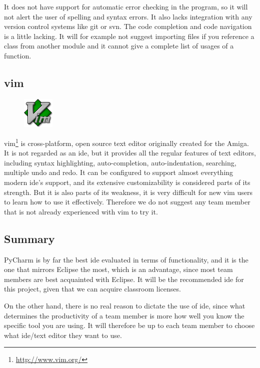 It does not have support for automatic error checking in the program, so it
will not alert the user of spelling and syntax errors. It also lacks integration
with any version control systems like git or svn. The code completion and
code navigation is a little lacking. It will for example not suggest importing
files if you reference a class from another module and it cannot give a
complete list of usages of a function.

\subsection{\gls{vim}}
\begin{figure}
	\vspace{-20pt}
	\includegraphics[width=1.5cm]{./planning/img/vim_logo}
	\vspace{-20pt}
\end{figure}
\gls{vim}\footnote{\url{http://www.vim.org/}} is cross-platform, open source text
editor originally created for the Amiga. It is not regarded as an \Gls{ide}, but it
provides all the regular features of text editors, including syntax
highlighting, auto-completion, auto-indentation, searching, multiple undo and
redo. It can be configured to support almost everything modern \Gls{ide}’s support,
and its extensive customizability is considered parts of its strength. But it
is also parts of its weakness, it is very difficult for new \gls{vim} users to learn
how to use it effectively. Therefore we do not suggest any team member that is
not already experienced with \gls{vim} to try it.

\subsection{Summary}
PyCharm is by far the best \Gls{ide} evaluated in terms of functionality, and it is
the one that mirrors \Gls{Eclipse} the most, which is an advantage, since most team
members are best acquainted with \Gls{Eclipse}. It will be the recommended \Gls{ide} for
this project, given that we can acquire classroom licenses.

On the other hand, there is no real reason to dictate the use of \Gls{ide}, since
what determines the productivity of a team member is more how well you know
the specific tool you are using. It will therefore be up to each team member
to choose what \Gls{ide}/text editor they want to use.


